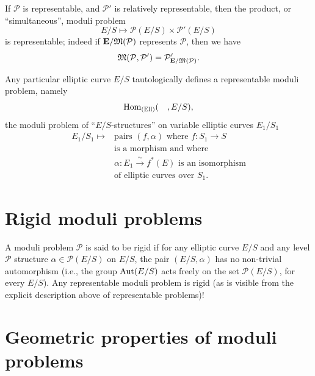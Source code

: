 \kmeqitem\label{item:4.3.4}
If $\mathcal{P}$ is representable, and $\mathcal{P}'$ is relatively representable, then the product, or ``simultaneous'', moduli problem
\[
E/S \longmapsto \mathcal{P}(E/S) \times \mathcal{P}'(E/S)
\]
is representable; indeed if $\mathbf{E}/\mathfrak{M}(\mathcal{P})$ represents $\mathcal{P}$, then we have
\[
\mathfrak{M}(\mathcal{P}, \mathcal{P}') = \mathcal{P}'_{\mathbf{E}/\mathfrak{M}(\mathcal{P})}.
\]

\kmeqitem\label{item:4.3.5}
Any particular elliptic curve $E/S$ tautologically defines a representable moduli problem, namely
\[
\operatorname{Hom}_{(\mathrm{Ell})}(\quad, E/S),
\]
the moduli problem of ``$E/S$-structures'' on variable elliptic curves $E_1/S_1$
\[
\begin{aligned}
E_1/S_1 \longmapsto {} & \text{pairs } (f, \alpha) \text{ where } f : S_1 \to S \\
& \text{is a morphism and where} \\
& \alpha : E_1 \xrightarrow{\ \sim\ } f^*(E) \text{ is an isomorphism} \\
& \text{of elliptic curves over } S_1.
\end{aligned}
\]

\section{Rigid moduli problems}
\label{sec:4.4}

A moduli problem $\mathcal{P}$ is said to be rigid if for any elliptic curve $E/S$ and any level $\mathcal{P}$ structure $\alpha \in \mathcal{P}(E/S)$ on $E/S$, the pair $(E/S, \alpha)$ has no non-trivial automorphism (i.e., the group $\operatorname{Aut}(E/S)$ acts freely on the set $\mathcal{P}(E/S)$, for every $E/S$). Any representable moduli problem is rigid (as is visible from the explicit description above of representable problems)!

\section{Geometric properties of moduli problems}
\label{sec:4.5}

